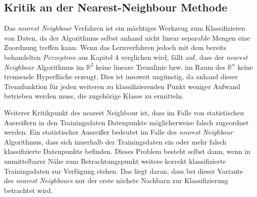 \documentclass[fontsize=11pt]{scrartcl}
\begin{document}
            \subsection{Kritik an der      Nearest-Neighbour Methode}
                Das \emph{nearest Neighbour} Verfahren ist ein mächtiges Werkzeug zum Klassifizieren von Daten, da der Algorithmus selbst anhand nicht linear separable Mengen eine Zuordnung treffen kann.\cite{ertel2016} Wenn das Lernverfahren jedoch mit dem bereits behandelten \emph{Perzeptron} aus Kapitel 4 verglichen wird, fällt auf, dass der \emph{nearest Neighbour} Algorithmus im $\mathbb{R}^2$ keine lineare Trennlinie bzw. im Raum des $\mathbb{R}^n$ keine trennende Hyperfläche erzeugt. Dies ist insoweit ungünstig, da anhand dieser Trennfunktion für jeden weiteren zu klassifizierenden Punkt weniger Aufwand betrieben werden muss, die zugehörige Klasse zu ermitteln.\cite{ertel2016}\par
                Weiterer Kritikpunkt des nearest Neighbour ist, dass im Falle von statistischen Ausreißern in den Trainingsdaten Datenpunkte möglicherweise falsch zugeordnet werden. Ein statistischer Ausreißer bedeutet im Falle des \emph{nearest Neighbour} Algorithmus, dass sich innerhalb der Trainingsdaten ein oder mehr falsch klassifizierte Datenpunkte befinden. Dieses Problem besteht selbst dann, wenn in unmittelbarer Nähe zum Betrachtungspunkt weitere korrekt klassifizierte Trainingsdaten zur Verfügung stehen. Das liegt daran, dass bei dieser Variante des \emph{nearest Neighbours} nur der erste nächste Nachbarn zur Klassifizierung betrachtet wird.\cite{ertel2016}\par
\end{document}
